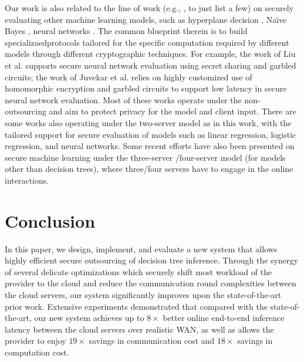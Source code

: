 \documentclass[10pt,journal,compsoc]{IEEEtran}
\begin{document}
Our work is also related to the line of work (e.g., \cite{BostPTG15,LiuJLA17,JuvekarVC18,MohasselZ17,MLSZP20}, to just list a few) on securely evaluating other machine learning models, such as hyperplane decision \cite{BostPTG15}, Na{\"{\i}}ve Bayes \cite{BostPTG15}, neural networks \cite{LiuJLA17,JuvekarVC18,MohasselZ17,MLSZP20}.    
%
The common blueprint therein is to build specializaedprotocols tailored for the specific computation required by different models through different cryptographic techniques.
%
For example, the work of Liu et al. \cite{LiuJLA17} supports secure neural network evaluation using secret sharing and garbled circuits;
%
the work of Juvekar et al. \cite{JuvekarVC18} relies on highly customized use of homomorphic encryption and garbled circuits to support low latency in secure neural network evaluation. 
%
Most of these works operate under the non-outsourcing and aim to protect privacy for the model and client input.
%
There are some works \cite{MohasselZ17,NikolaenkoWIJBT13ridge} also operating under the two-server model as in this work, with the tailored support for secure evaluation of models such as linear regression, logistic regression, and neural networks.
%
Some recent efforts have also been presented on secure machine learning under the three-server \cite{MohasselR18,WaghGC19}/four-server \cite{Chaudhari2020} model (for models other than decision trees), where three/four servers have to engage in the online interactions.


\section{Conclusion}
\label{sec:conclusion}


In this paper, we design, implement, and evaluate a new system that allows highly efficient secure outsourcing of decision tree inference.
%
Through the synergy of several delicate optimizations which securely shift most workload of the provider to the cloud and reduce the communication round complexities between the cloud servers, our system significantly improves upon the state-of-the-art prior work.
% 
Extensive experiments demonstrated that compared with the state-of-the-art, our new system achieves up to $8 \times$ better online end-to-end inference latency between the cloud servers over realistic WAN, as well as allows the provider to enjoy $19 \times$ savings in communication cost and $18 \times$ savings in computation cost.


\balance

%

\end{document}
